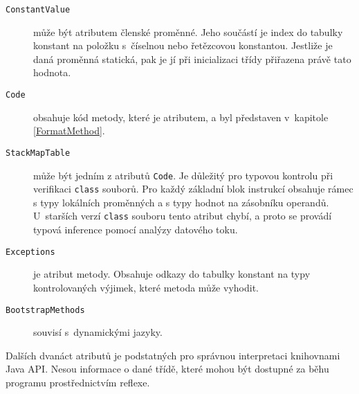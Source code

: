 \begin{description}

\item [\texttt{ConstantValue}] může být atributem členské proměnné. Jeho součástí je index do tabulky konstant na položku s~číselnou nebo řetězcovou konstantou. Jestliže je daná proměnná statická, pak je jí při inicializaci třídy přiřazena právě tato hodnota.

\item [\texttt{Code}] obsahuje kód metody, které je atributem, a byl představen v~kapitole \ref{FormatMethod}.

\item [\texttt{StackMapTable}] může být jedním z atributů \texttt{Code}. Je důležitý pro typovou kontrolu při verifikaci \texttt{class} souborů. Pro každý základní blok instrukcí obsahuje rámec s typy lokálních proměnných a s typy hodnot na zásobníku operandů. U~starších verzí \texttt{class} souboru tento atribut chybí, a proto se provádí typová inference pomocí analýzy datového toku.

\item [\texttt{Exceptions}] je atribut metody. Obsahuje odkazy do tabulky konstant na typy kontrolovaných výjimek, které metoda může vyhodit.

\item [\texttt{BootstrapMethods}] souvisí s~dynamickými jazyky.

\end{description}

Dalších dvanáct atributů je podstatných pro správnou interpretaci knihovnami Java API. Nesou informace o dané třídě, které mohou být dostupné za běhu programu prostřednictvím reflexe.

